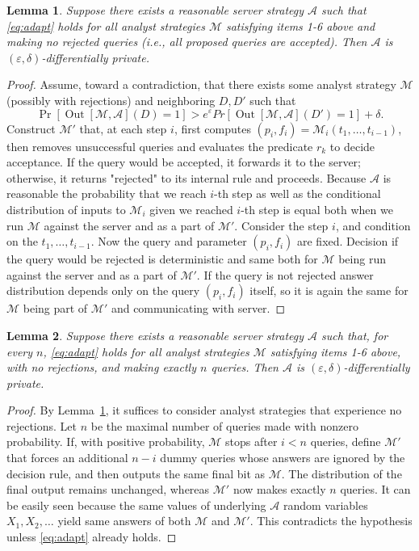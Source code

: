 \documentclass[12pt,letterpaper]{article}
\let\eps\varepsilon
\newtheorem{lemma}{Lemma}
\begin{document}
\begin{lemma}
  \label{lm:refused}
Suppose there exists a reasonable server strategy $\mathcal{A}$ such that \eqref{eq:adapt} holds for all analyst strategies $\mathcal{M}$ satisfying items 1-6 above and making no rejected queries (i.e., all proposed queries are accepted). Then $\mathcal{A}$ is $(\eps,\delta)$-differentially private.
\end{lemma}
\begin{proof}
Assume, toward a contradiction, that there exists some analyst strategy $\mathcal{M}$ (possibly with rejections) and neighboring $D,D'$ such that
\[
  \Pr[\operatorname{Out}[\mathcal{M},\mathcal{A}](D)=1] > e^{\eps}Pr[\operatorname{Out}[\mathcal{M},\mathcal{A}](D')=1] + \delta.
\]
Construct $\mathcal{M}'$ that, at each step $i$, first computes $(p_i,f_i)=\mathcal{M}_i(t_{1}, \ldots, t_{i - 1})$, then removes unsuccessful queries and evaluates the predicate $r_k$ to decide acceptance. If the query would be accepted, it forwards it to the server; otherwise, it returns "rejected" to its internal rule and proceeds. Because $\mathcal{A}$ is reasonable the probability that we reach $i$-th step as well as the conditional distribution of inputs to $\mathcal{M}_i$ given we reached $i$-th step is equal both when we run $\mathcal{M}$ against the server and as a part of $\mathcal{M}'$. Consider the step $i$, and condition on the $t_1, \ldots, t_{i - 1}$. Now the query and parameter $(p_i, f_i)$ are fixed. Decision if the query would be rejected is deterministic and same both for $\mathcal{M}$ being run against the server and as a part of $\mathcal{M}'$. If the query is not rejected answer distribution depends only on the query $(p_i, f_i)$ itself, so it is again the same for $\mathcal{M}$ being part of $\mathcal{M}'$ and communicating with server.
\end{proof}

\begin{lemma}
  \label{lm:equal}
Suppose there exists a reasonable server strategy $\mathcal{A}$ such that, for every $n$, \eqref{eq:adapt} holds for all analyst strategies $\mathcal{M}$ satisfying items 1-6 above, with no rejections, and making exactly $n$ queries. Then $\mathcal{A}$ is $(\eps,\delta)$-differentially private.
\end{lemma}
\begin{proof}
By Lemma~\ref{lm:refused}, it suffices to consider analyst strategies that experience no rejections. Let $n$ be the maximal number of queries made with nonzero probability. If, with positive probability, $\mathcal{M}$ stops after $i<n$ queries, define $\mathcal{M}'$ that forces an additional $n-i$ dummy queries whose answers are ignored by the decision rule, and then outputs the same final bit as $\mathcal{M}$. The distribution of the final output remains unchanged, whereas $\mathcal{M}'$ now makes exactly $n$ queries. It can be easily seen because the same values of underlying $\mathcal{A}$ random variables $X_1, X_2, \ldots$ yield same answers of both $\mathcal{M}$ and $\mathcal{M}'$. This contradicts the hypothesis unless \eqref{eq:adapt} already holds.
\end{proof}
\end{document}
